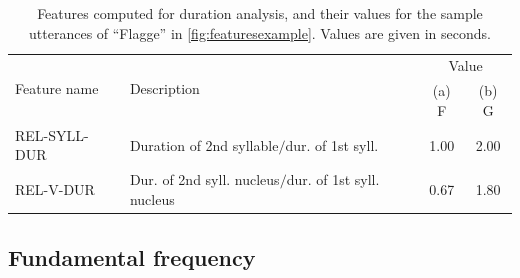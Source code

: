 \begin{table}%
		\centering
		\caption[Features computed for duration analysis]{Features computed for duration analysis, and their values for the sample utterances of ``Flagge'' in \cref{fig:featuresexample}. Values are given in seconds. }
		
%
%		
		\begin{tabularx}{\textwidth}{lXcc}
		\toprule
		\multirow{2}{*}{Feature name} 
									& \multirow{2}{*}{Description}
														& \multicolumn{2}{c}{Value} \\
	&												&  (a) F		& (b) G \\
		\midrule
		REL-SYLL-DUR 	
			& Duration of 2nd syllable$/$dur. of 1st syll.
			& 1.00			& 2.00			\\
		REL-V-DUR 		
			& Dur. of 2nd syll. nucleus$/$dur. of 1st syll. nucleus
			& 0.67			& 1.80 			\\
		\bottomrule	
		\end{tabularx}
		\label{tab:durationfeatures}
\end{table}



	\subsection{Fundamental frequency}
	\label{sec:prosody:f0}
	
